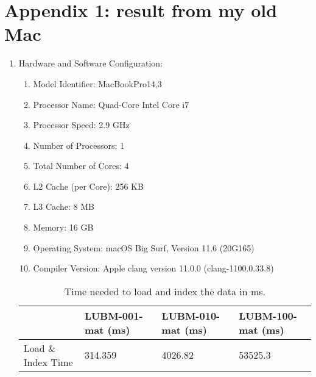 \documentclass{article}
\begin{document}
\section*{Appendix 1: result from my old Mac}
\begin{enumerate}
	\item Hardware and Software Configuration:

\begin{enumerate}
\item Model Identifier:	MacBookPro14,3

\item Processor Name:	Quad-Core Intel Core i7

\item Processor Speed:	2.9 GHz

\item Number of Processors:	1

\item Total Number of Cores:	4

\item L2 Cache (per Core):	256 KB

\item L3 Cache:	8 MB

\item Memory:	16 GB

\item Operating System: macOS Big Surf, Version 11.6 (20G165)

\item Compiler Version: Apple clang version 11.0.0 (clang-1100.0.33.8)

\end{enumerate}

\begin{table}[H]\centering
\begin{tabular}{|l|l|l|l|}
\hline
                   & LUBM-001-mat (ms) & LUBM-010-mat (ms) & LUBM-100-mat (ms)\\ \hline
Load \& Index Time & 314.359         & 4026.82        & 53525.3        \\ \hline
\end{tabular}
\caption{Time needed to load and index the data in ms.}
\end{table}



\end{enumerate}
\end{document}
